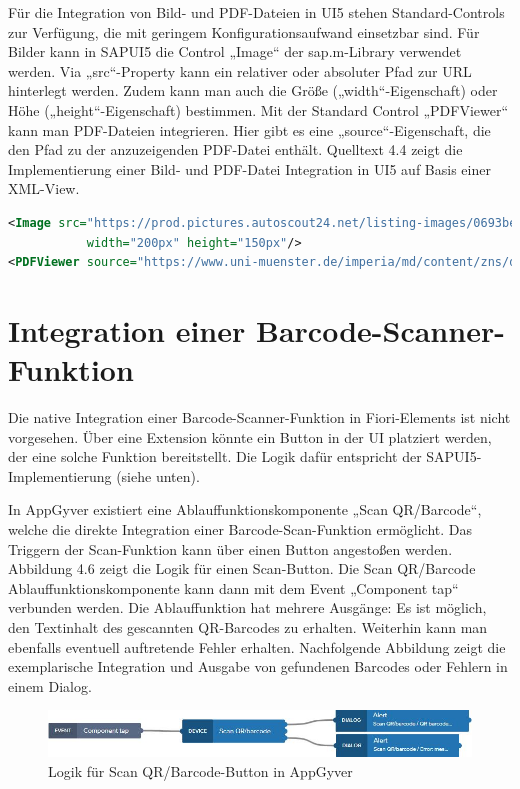 Für die Integration von Bild- und PDF-Dateien in UI5 stehen Standard-Controls zur Verfügung, die mit geringem Konfigurationsaufwand einsetzbar sind. Für Bilder kann in SAPUI5 die Control „Image“ der sap.m-Library verwendet werden. Via „src“-Property kann ein relativer oder absoluter Pfad zur URL hinterlegt werden. Zudem kann man auch die Größe („width“-Eigenschaft) oder Höhe („height“-Eigenschaft) bestimmen. Mit der Standard Control „PDFViewer“ kann man PDF-Dateien integrieren. Hier gibt es eine „source“-Eigenschaft, die den Pfad zu der anzuzeigenden PDF-Datei enthält. Quelltext 4.4 zeigt die Implementierung einer Bild- und PDF-Datei Integration in UI5 auf Basis einer XML-View.
\begin{lstlisting}[language=XML,  caption=Implementierung Bild- und PDF Datei Integration in SAPUI5]
<Image src="https://prod.pictures.autoscout24.net/listing-images/0693be87-aaad-4dc8-99c5-a69b3bd48b81_1934e390-16f2-4e47-b248-02e9cc9b746b.jpg"
           width="200px" height="150px"/>
<PDFViewer source="https://www.uni-muenster.de/imperia/md/content/zns/dokumente/beispielexpos___kowi_empirisch.pdf"/>
\end{lstlisting}

\section{Integration einer Barcode-Scanner-Funktion}

Die native Integration einer Barcode-Scanner-Funktion in Fiori-Elements ist nicht vorgesehen. Über eine Extension könnte ein Button in der UI platziert werden, der eine solche Funktion bereitstellt. Die Logik dafür entspricht der SAPUI5-Implementierung (siehe unten).

In AppGyver existiert eine Ablauffunktionskomponente „Scan QR/Barcode“, welche die direkte Integration einer Barcode-Scan-Funktion ermöglicht. Das Triggern der Scan-Funktion kann über einen Button angestoßen werden. Abbildung 4.6 zeigt die Logik für einen Scan-Button. Die Scan QR/Barcode Ablauffunktionskomponente kann dann mit dem Event „Component tap“ verbunden werden. Die Ablauffunktion hat mehrere Ausgänge: Es ist möglich, den Textinhalt des gescannten QR-Barcodes zu erhalten. Weiterhin kann man ebenfalls eventuell auftretende Fehler erhalten. Nachfolgende Abbildung zeigt die exemplarische Integration und Ausgabe von gefundenen Barcodes oder Fehlern in einem Dialog.

\begin{figure}[htbp]
 \centering
 \includegraphics[width=1.0\textwidth]{Bilder/appgyver/4_8_logik_scan_barcode.jpg}
 \caption{Logik für Scan QR/Barcode-Button in AppGyver}
\end{figure}

